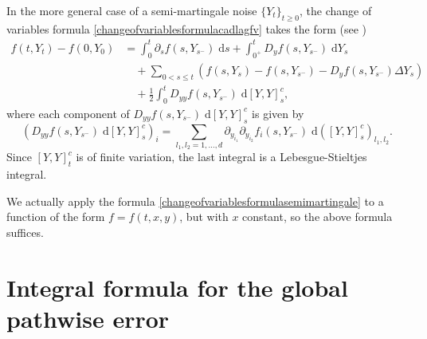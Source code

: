 \documentclass[reqno,12pt]{amsart}
\theoremstyle{plain} %
\theoremstyle{definition} %
\begin{document}
In the more general case of a semi-martingale noise $\{Y_t\}_{t\geq 0}$, the change of variables formula \cref{changeofvariablesformulacadlagfv} takes the form (see \cite[Theorems II.32 and II.33]{Protter2005})
\begin{equation}
    \label{changeofvariablesformulasemimartingale}
    \begin{aligned}
        f(t, Y_t) - f(0, Y_0) & = \int_0^t \partial_s f(s, Y_{s^-})\;\mathrm{d}s + \int_{0^+}^t D_y f(s, Y_{s^-}) \;\mathrm{d}Y_s \\
        & \quad + \sum_{0 < s \leq t} \left( f(s, Y_s) - f(s, Y_{s^{-}}) - D_y f(s, Y_{s^-})\Delta Y_s\right) \\
        & \quad + \frac{1}{2}\int_0^t D_{yy}f(s, Y_{s^-})\;\mathrm{d}[Y, Y]_s^c,
    \end{aligned}
\end{equation}
where each component of $D_{yy}f(s, Y_{s^-})\;\mathrm{d}[Y, Y]_s^c$ is given by
\[ \left(D_{yy}f(s, Y_{s^-})\;\mathrm{d}[Y, Y]_s^c\right)_i = \sum_{l_1, l_2 = 1, \ldots, d} \partial_{y_{i_1}}\partial_{y_{i_2}} f_i(s, Y_{s^-})\;\mathrm{d}([Y, Y]_s^c)_{l_1, l_2}.
\]
Since $[Y, Y]_t^c$ is of finite variation, the last integral is a Lebesgue-Stieltjes integral.

We actually apply the formula \cref{changeofvariablesformulasemimartingale} to a function of the form $f=f(t, x, y)$, but with $x$ constant, so the above formula suffices.

\section{Integral formula for the global pathwise error}
\end{document}
